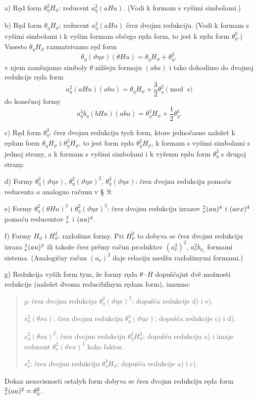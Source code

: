 \documentclass[11pt]{article}
\let\A\relax
\newcommand{\A}{\mathfrak A}
\begin{document}
\noindent\mbox{a)} Ręd form $\theta_\eta^2H_\vartheta$: reducent $a_\eta^2(aHu)$. (Vodi k formam s vyšimi simbolami.)

\noindent\mbox{b)} Ręd form $\theta_\eta H_\vartheta$: reducent $a_\eta^2(aHu)$ črez dvojnu redukciju. (Vodi k formam s vyšimi simbolami i k vyšim formam obćego ręda form, to jest k rędu form $\theta_\eta^2$.) Vmesto $\theta_\eta H_\vartheta$ razmatrivamo ręd form
\[
\theta_\eta(\vartheta\eta x)(\theta Hu)=\theta_\eta H_\vartheta+\theta_\eta^2,
\]
v njem zaměnjamo simboly $\theta$ nižšeju formoju $(abu)$ i tako dohodimo do dvojnoj redukcije ręda form
\[
a_\eta^2(aHu)(abu)=\theta_\eta H_\vartheta+\frac32\theta_\eta^2\pmod{s}
\]
do konečnoj formy
\[
a_\eta^3b_\eta(bHu)(abu)=\theta_\eta^3H_\vartheta+\frac12\theta_\eta^4.
\]

\noindent\mbox{c)} Ręd form $\theta_\eta^3$: črez dvojnu redukciju tych form, ktore jednočasno naležet k rędam form $\theta_\eta H_\vartheta$ i $\theta_\eta^2H_\vartheta$, to jest form ręda $\theta_\eta^2H_\vartheta$, k formam s vyšimi simbolami s jednoj strany, a k formam s vyšimi simbolami i k vyšemu rędu form $\theta_\eta^3$ s drugoj strany.

\noindent\mbox{d)} Formy $\theta_\eta^2(\vartheta\eta x)$, $\theta_\eta^2(\vartheta\eta x)^2$, $\theta_\eta^3(\vartheta\eta x)$: črez dvojnu redukciju pomoću reducenta $a$ analogno računu v \S\ 9.

\noindent\mbox{e)} Formy $\theta_\eta^2(\theta Hu)^2$ i $\theta_\eta^2(\vartheta\eta x)^2$: črez dvojnu redukciju izrazov $\A_\nu^2(a\A u)^4$ i $(a\A\nu x)^4$ pomoću reducentov $\A_\nu^2$ i $(a\A u)^4$.

\noindent\mbox{f)} Formy $H_\vartheta$ i $H_\vartheta^2$: razložime formy. Pri $H_\vartheta^2$ to dobyva se črez dvojnu redukciju izraza $\A_\nu^2(a\A u)^2$ ili takože črez prěmy račun produktov $(a_\nu^2)^2$, $a_\nu^2b_{\nu_1}$ formami sistema. (Analogičny račun $(a_\nu)^2$ daje relaciju medžu razložimymi formami.)

\noindent\mbox{g)} Redukcija vyših form tym, že formy ręda $\theta\cdot H$ dopušćajut dvě možnosti redukcije (naležet dvoma reducibilnym rędam form), imenno:
\begin{quote}\small
$g$: črez dvojnu redukciju $\theta_\eta^2(\vartheta\eta x)^2$; dopušća redukcije \mbox{d)} i \mbox{e)}.\par
$s_\vartheta^2(\theta su)$: črez dvojnu redukciju $\theta_\eta^3(\vartheta\eta x)$; dopušća redukcije \mbox{c)} i \mbox{d)}.\par
$s_\vartheta^2(\theta su)^2$: črez dvojnu redukciju $\theta_\eta^2H_\vartheta^2$; dopušća redukciju \mbox{a)} i imaje reducent $\theta_\nu^2(\vartheta\nu x)^2$ kako faktor.\par
$s_\nu^2$: črez dvojnu redukciju $\theta_\eta^3H_\vartheta$; dopušća redukcije \mbox{a)} i \mbox{c)}.
\end{quote}
Dokaz nezavisnosti ostalyh form dobyva se črez dvojnu redukciju ręda form $\A_\nu^2(a\A u)^2=\theta_\eta^2$.
\end{document}
